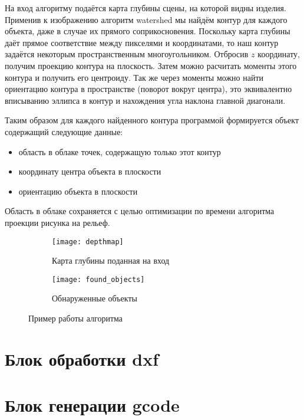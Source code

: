         
        На вход алгоритму подаётся карта глубины сцены, на которой видны изделия. Применив к изображению алгоритм watershed мы найдём контур для каждого объекта, даже в случае их прямого соприкосновения. Поскольку карта глубины даёт прямое соответствие между пикселями и координатами, то наш контур задаётся некоторым пространственным многоугольником. Отбросив $ z $ координату, получим проекцию контура на плоскость. Затем можно расчитать моменты этого контура и получить его центроиду. Так же через моменты можно найти ориентацию контура в пространстве (поворот вокруг центра), это эквивалентно вписыванию эллипса в контур и нахождения угла наклона главной диагонали.
        
        Таким образом для каждого найденного контура программой формируется объект содержащий следующие данные:
        \begin{itemize}
            \item область в облаке точек, содержащую только этот контур
            \item координату центра объекта в плоскости
            \item ориентацию объекта в плоскости
        \end{itemize}
        Область в облаке сохраняется с целью оптимизации по времени алгоритма проекции рисунка на рельеф.
        
        \begin{figure}[H]
            \begin{subfigure}{0.5\linewidth}
                \texttt{[image: depthmap]}
                \caption{Карта глубины поданная на вход}
            \end{subfigure}
            \begin{subfigure}{0.5\linewidth}
                \texttt{[image: found\_objects]}
                \caption{Обнаруженные объекты}
            \end{subfigure}
            \caption{Пример работы алгоритма}
        \end{figure}
        
    \section{Блок обработки dxf}
    
    \section{Блок генерации gcode}